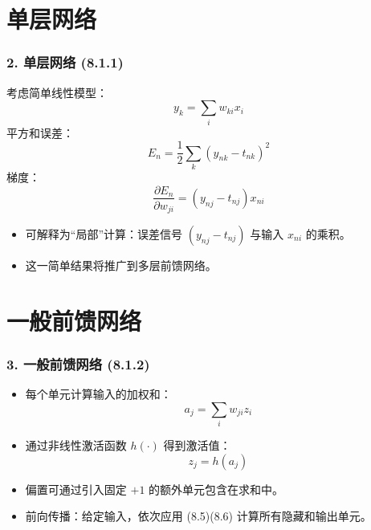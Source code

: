 \documentclass[t,aspectratio=169]{beamer} %
\begin{document}
\section{单层网络}

\begin{frame}
    \frametitle{2. 单层网络 (8.1.1)}
    考虑简单线性模型：
    \begin{equation}
        y_k = \sum_i w_{ki} x_i
        \tag{8.2}
    \end{equation}
    平方和误差：
    \begin{equation}
        E_n = \frac{1}{2} \sum_k (y_{nk} - t_{nk})^2
        \tag{8.3}
    \end{equation}
    梯度：
    \begin{equation}
        \frac{\partial E_n}{\partial w_{ji}} = (y_{nj} - t_{nj}) x_{ni}
        \tag{8.4}
    \end{equation}
    \begin{itemize}
        \item 可解释为\alert{“局部”计算}：误差信号 $(y_{nj} - t_{nj})$ 与输入 $x_{ni}$ 的乘积。
        \item 这一简单结果将推广到多层前馈网络。
    \end{itemize}
\end{frame}

\section{一般前馈网络}

\begin{frame}
    \frametitle{3. 一般前馈网络 (8.1.2)}
    \begin{itemize}
        \item 每个单元计算输入的\alert{加权和}：
        \begin{equation}
            a_j = \sum_i w_{ji} z_i
            \tag{8.5}
        \end{equation}
        \item 通过\alert{非线性激活函数} $h(\cdot)$ 得到激活值：
        \begin{equation}
            z_j = h(a_j)
            \tag{8.6}
        \end{equation}
        \item 偏置可通过引入固定 $+1$ 的额外单元包含在求和中。
        \item \alert{前向传播}：给定输入，依次应用 (8.5)(8.6) 计算所有隐藏和输出单元。
    \end{itemize}
\end{frame}
\end{document}
